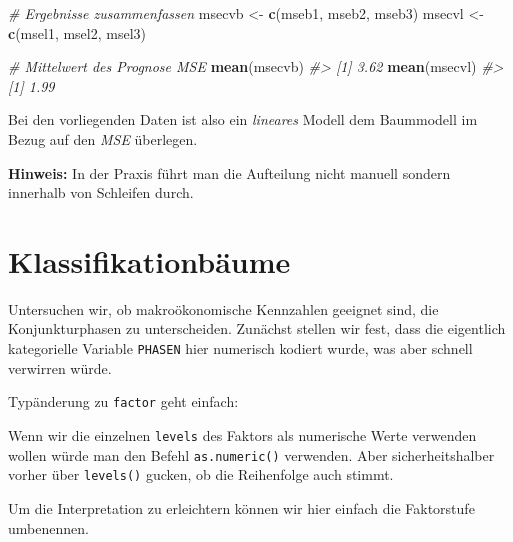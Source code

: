 \documentclass[12pt,]{book}
\makeatletter
\newenvironment{Shaded}{\begin{snugshade}}{\end{snugshade}}
\newcommand{\KeywordTok}[1]{\textcolor[rgb]{0.13,0.29,0.53}{\textbf{{#1}}}}
\newcommand{\StringTok}[1]{\textcolor[rgb]{0.31,0.60,0.02}{{#1}}}
\newcommand{\CommentTok}[1]{\textcolor[rgb]{0.56,0.35,0.01}{\textit{{#1}}}}
\newcommand{\NormalTok}[1]{{#1}}
\newenvironment{kframe}{%
\medskip{}
\setlength{\fboxsep}{.8em}
 \def\at@end@of@kframe{}%
 \ifinner\ifhmode%
  \def\at@end@of@kframe{\end{minipage}}%
  \begin{minipage}{\columnwidth}%
 \fi\fi%
 \def\FrameCommand##1{\hskip\@totalleftmargin \hskip-\fboxsep
 \colorbox{shadecolor}{##1}\hskip-\fboxsep
     \hskip-\linewidth \hskip-\@totalleftmargin \hskip\columnwidth}%
 \MakeFramed {\advance\hsize-\width
   \@totalleftmargin\z@ \linewidth\hsize
   \@setminipage}}%
 {\par\unskip\endMakeFramed%
 \at@end@of@kframe}
\renewenvironment{Shaded}{\begin{kframe}}{\end{kframe}}
\makeatother
\begin{document}
\begin{Shaded}
\begin{Highlighting}[]
\CommentTok{# Ergebnisse zusammenfassen}
\NormalTok{msecvb <-}\StringTok{ }\KeywordTok{c}\NormalTok{(mseb1, mseb2, mseb3)}
\NormalTok{msecvl <-}\StringTok{ }\KeywordTok{c}\NormalTok{(msel1, msel2, msel3)}

\CommentTok{# Mittelwert des Prognose MSE}
\KeywordTok{mean}\NormalTok{(msecvb)}
\CommentTok{#> [1] 3.62}
\KeywordTok{mean}\NormalTok{(msecvl)}
\CommentTok{#> [1] 1.99}
\end{Highlighting}
\end{Shaded}

Bei den vorliegenden Daten ist also ein \emph{lineares} Modell dem
Baummodell im Bezug auf den \emph{MSE} überlegen.

\textbf{Hinweis:} In der Praxis führt man die Aufteilung nicht manuell
sondern innerhalb von Schleifen durch.

\section{Klassifikationbäume}\label{klassifikationbaume}

Untersuchen wir, ob makroökonomische Kennzahlen geeignet sind, die
Konjunkturphasen zu unterscheiden. Zunächst stellen wir fest, dass die
eigentlich kategorielle Variable \texttt{PHASEN} hier numerisch kodiert
wurde, was aber schnell verwirren würde.

\begin{Shaded}
\end{Shaded}

Typänderung zu \texttt{factor} geht einfach:

\begin{Shaded}
\end{Shaded}

Wenn wir die einzelnen \texttt{levels} des Faktors als numerische Werte
verwenden wollen würde man den Befehl \texttt{as.numeric()} verwenden.
Aber sicherheitshalber vorher über \texttt{levels()} gucken, ob die
Reihenfolge auch stimmt.

Um die Interpretation zu erleichtern können wir hier einfach die
Faktorstufe umbenennen.
\end{document}
